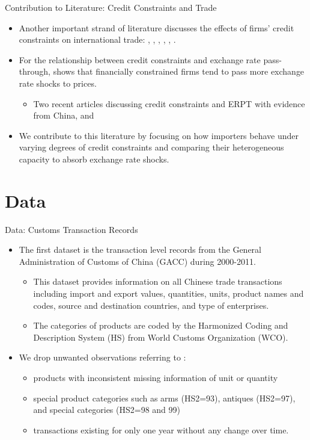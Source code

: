 \documentclass[10pt]{beamer}
\begin{document}
\begin{frame}{Contribution to Literature: Credit Constraints and Trade}
	\begin{itemize}
		\item Another important strand of literature discusses the effects of firms’ credit constraints on international trade: \cite{kroszner2007} \cite{manova2013}, \cite{chaney2016}, \cite {manova2013}, \cite{feenstra2015}, \cite{manova-wei-zhang2015}, \cite{fan-lai-li2015}.
		\item For the relationship between credit constraints and exchange rate pass-through, \cite{strasser2013} shows that financially constrained firms tend to pass more exchange rate shocks to prices.
		\begin{itemize}
			\item Two recent articles discussing credit constraints and ERPT with evidence from China, \cite{dai2021} and \cite{xu-guo2021}
		\end{itemize}
		\item We contribute to this literature by focusing on how importers behave under varying degrees of credit constraints and comparing their heterogeneous capacity to absorb exchange rate shocks. 
	\end{itemize}	
\end{frame}

\section{Data}

\begin{frame}{Data: Customs Transaction Records}
	\begin{itemize}
		\item The first dataset is the transaction level records from the General Administration of Customs of China (GACC) during 2000-2011.
		\begin{itemize}
			\item This dataset provides information on
			all Chinese trade transactions including import and export values, quantities, units, product names and codes, source and destination countries, and type of enterprises.
			\item The categories of products are coded by the Harmonized Coding and Description System (HS) from World Customs Organization (WCO).
		\end{itemize}
		\item We drop unwanted observations referring to \cite{lmx2015}:
		\begin{itemize}
			\item products with inconsistent missing information of unit or quantity
			\item special product categories such as arms (HS2=93), antiques (HS2=97), and special categories (HS2=98 and 99)
			\item transactions existing for only one year without any change over time.
		\end{itemize}
	\end{itemize}
\end{frame}
\end{document}
